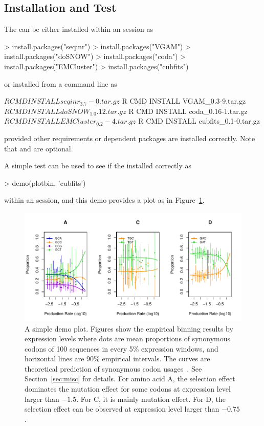 \subsection[Installation and Test]{Installation and Test}

The  can be either installed within an  session as
\begin{Code}
> install.packages("seqinr")
> install.packages("VGAM")
> install.packages("doSNOW")
> install.packages("coda")
> install.packages("EMCluster")
> install.packages("cubfits")
\end{Code}
or installed from a command line as
\begin{Command}
$ R CMD INSTALL seqinr_3.7-0.tar.gz
$ R CMD INSTALL VGAM_0.3-9.tar.gz
$ R CMD INSTALL doSNOW_1.0.12.tar.gz
$ R CMD INSTALL coda_0.16-1.tar.gz
$ R CMD INSTALL EMCluster_0.2-4.tar.gz
$ R CMD INSTALL cubfits_0.1-0.tar.gz
\end{Command}
provided other requirements or dependent packages are installed correctly.
Note that  and  are optional.

A simple test can be used to see if the  installed correctly
as
\begin{Code}
> demo(plotbin, 'cubfits')
\end{Code}
within an  session, and this demo provides a plot as in
Figure~\ref{fig:plotbin}.
\begin{figure}[ht]
\centering
\includegraphics[width=6in]{cubfits-include/figure/plotbin}
\caption{A simple demo plot. Figures show the empirical binning results
by expression levels where dots are mean proportions of synonymous codons
of 100 sequences in every 5\% expression windows, and horizontal lines
are 90\% empirical intervals. The curves are theoretical prediction of
synonymous codon usages~\citep{Shah2011}. See Section~\ref{sec:misc} for
details.
For amino acid A, the selection effect dominates the mutation effect for
some codons at expression level larger than $-1.5$. For C,
it is mainly mutation effect. For D, the selection effect can be
observed at expression level larger than $-0.75$.
}
\label{fig:plotbin}
\end{figure}
